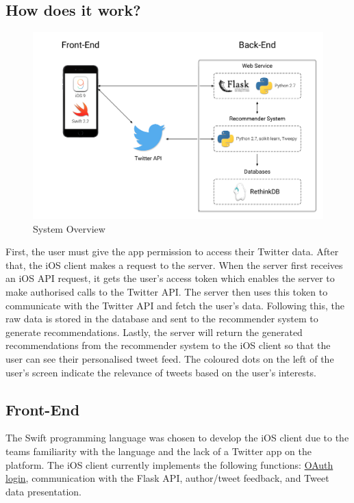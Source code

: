 \documentclass{article}
\begin{document}
\subsection{How does it work?} %
\begin{figure}[H] 
    \centering
    \includegraphics[width=\textwidth]{system_overview}  
    \caption{System Overview}
\end{figure}

First, the user must give the app permission to access their Twitter data. After that, the iOS client makes a request to the server. When the server first receives an iOS API request, it gets the user's access token which enables the server to make authorised calls to the Twitter API. The server then uses this token to communicate with the Twitter API and fetch the user's data. Following this, the raw data is stored in the database and sent to the recommender system to generate recommendations. 
Lastly, the server will return the generated recommendations from the recommender system to the iOS client so that the user can see their personalised tweet feed. The coloured dots on the left of the user's screen indicate the relevance of tweets based on the user's interests.

\subsection{Front-End} %
The Swift programming language was chosen to develop the iOS client due to the teams familiarity with the language and the lack of a Twitter app on the platform. The iOS client currently implements the following functions: \hyperlink{oauth}{OAuth login}, communication with the Flask API, author/tweet feedback, and Tweet data presentation.
\end{document}

